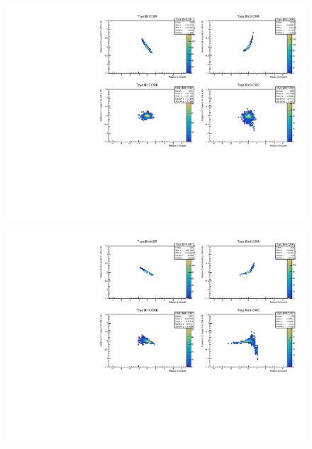 \begin{figure}[H]
\includegraphics[width=\textwidth]{plots/diffx/instab/linearfx/instabilities_mjj_QCD_Mgraph_Signal_Sh2211_BSMCQCDSTATS_linearfx_newbinning_sherpaasimov_bin3.pdf}
\end{figure}
\begin{figure}[H]
\includegraphics[width=\textwidth]{plots/diffx/instab/linearfx/instabilities_mjj_QCD_Mgraph_Signal_Sh2211_BSMCQCDSTATS_linearfx_newbinning_sherpaasimov_bin4.pdf}
\end{figure}

